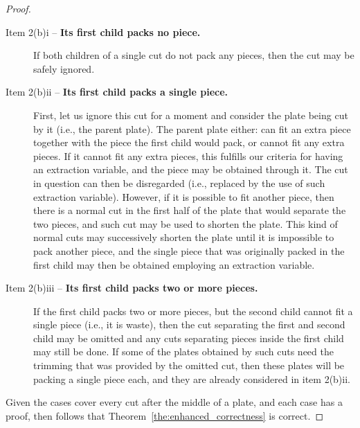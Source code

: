 \documentclass[9pt]{entcs}
\begin{document}
\begin{proof}
\begin{description}
\item[Item 2(b)i -- \textbf{Its first child packs no piece.}]
If both children of a single cut do not pack any pieces, then the cut may be safely ignored.
\item[Item 2(b)ii -- \textbf{Its first child packs a single piece.}]
First, let us ignore this cut for a moment and consider the plate being cut by it (i.e., the parent plate).
The parent plate either: can fit an extra piece together with the piece the first child would pack, or cannot fit any extra pieces.
If it cannot fit any extra pieces, this fulfills our criteria for having an extraction variable, and the piece may be obtained through it.
The cut in question can then be disregarded (i.e., replaced by the use of such extraction variable).
However, if it is possible to fit another piece, then there is a normal cut in the first half of the plate that would separate the two pieces, and such cut may be used to shorten the plate.
This kind of normal cuts may successively shorten the plate until it is impossible to pack another piece, and the single piece that was originally packed in the first child may then be obtained employing an extraction variable.
\item[Item 2(b)iii -- \textbf{Its first child packs two or more pieces.}]
If the first child packs two or more pieces, but the second child cannot fit a single piece (i.e., it is waste), then the cut separating the first and second child may be omitted and any cuts separating pieces inside the first child may still be done.
If some of the plates obtained by such cuts need the trimming that was provided by the omitted cut, then these plates will be packing a single piece each, and they are already considered in item 2(b)ii.
\end{description}

Given the cases cover every cut after the middle of a plate, and each case has a proof, then follows that Theorem~\ref{the:enhanced_correctness} is correct.

\end{proof}
\end{document}
